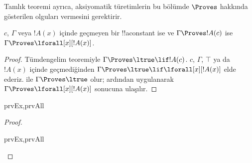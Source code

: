 \documentclass[../../../include/open-logic-section]{subfiles}
\begin{document}


\begin{explain}
  Tamlık teoremi ayrıca, aksiyomatik türetimlerin bu bölümde $\Proves$
  hakkında gösterilen olguları vermesini gerektirir.
\end{explain}

\begin{thm}
 $c$, $\Gamma$ veya $!A(x)$ içinde
geçmeyen bir !!a{constant} ise ve $\Gamma \Proves !A(c)$ ise
$\Gamma \Proves \lforall[x][!A(x)]$.
\end{thm}

\begin{proof}
Tümdengelim teoremiyle $\Gamma \Proves \ltrue \lif !A(c)$. $c$, $\Gamma$,
$\top$ ya da~$!A(x)$ içinde geçmediğinden $\Gamma \Proves
\ltrue \lif \lforall[x][!A(x)]$ elde ederiz.  ile
$\Gamma \Proves \ltrue$ olur; ardından  uygulanarak
$\Gamma \Proves \lforall[x][!A(x)]$ sonucuna ulaşılır.
\end{proof}

\begin{prop}
\begin{tagenumerate}{prvEx,prvAll}

\end{tagenumerate}
\end{prop}

\begin{proof}
\begin{tagenumerate}{prvEx,prvAll}
\end{tagenumerate}
\end{proof}
\end{document}
